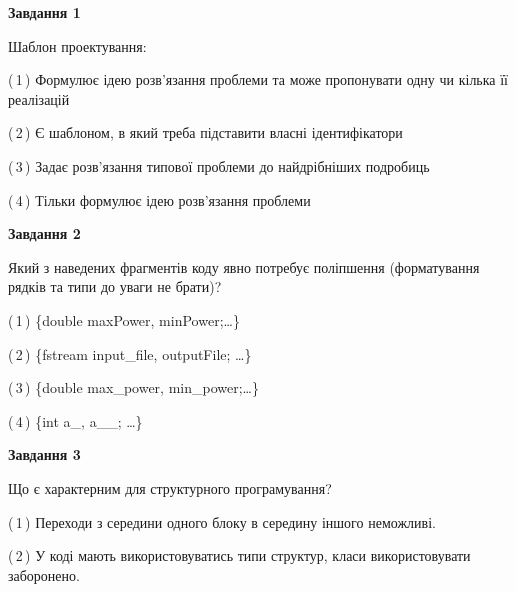 \documentclass[10pt, ukrainian]{article}
\begin{document}
{
\begin {large}
{\begin {center}\textbf{Завдання 1}\end {center}}\par
Шаблон проектування:\par
\vspace{2mm}



(\,1\,) Формулює ідею розв'язання проблеми та може пропонувати одну чи кілька її реалізацій%



(\,2\,) Є шаблоном, в який треба підставити власні ідентифікатори%



(\,3\,) Задає розв'язання типової проблеми до найдрібніших подробиць%



(\,4\,) Тільки формулює ідею розв'язання проблеми%


{\begin {center}\textbf{Завдання 2}\end {center}}\par
Який з наведених фрагментів коду явно потребує поліпшення (форматування рядків та типи до уваги не брати)?\par
\vspace{2mm}



(\,1\,) \{double maxPower, minPower;…\} %



(\,2\,) \{fstream input\_file, outputFile; …\}%



(\,3\,) \{double max\_power, min\_power;…\} %



(\,4\,) \{int a\_, a\_\_; …\}%


{\begin {center}\textbf{Завдання 3}\end {center}}\par
Що є характерним для структурного програмування?\par
\vspace{2mm}



(\,1\,) Переходи з середини одного блоку в середину іншого неможливі. %



(\,2\,) У коді мають використовуватись типи структур, класи використовувати заборонено. %




\end{large}}
\end{document}
